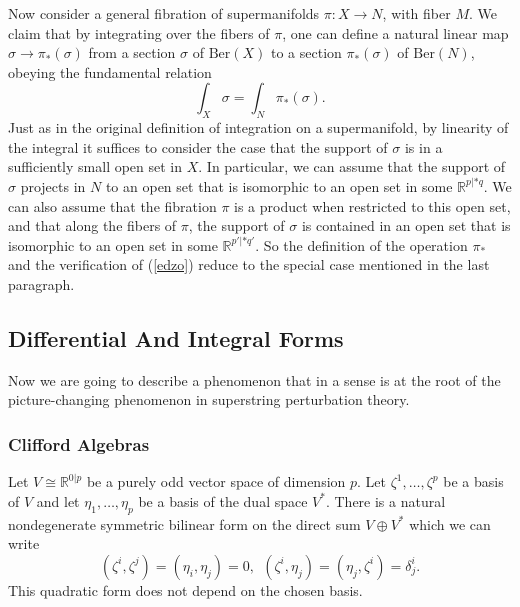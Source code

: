 \documentclass[11pt,a4paper]{article}
\def\R{{\mathbb R}}
\def\Ber{{\mathrm {Ber}}}
\begin{document}
Now consider a general fibration of supermanifolds $\pi:X\to N$, with fiber $M$.  We claim that 
by integrating over the fibers of $\pi$, one can define a natural linear map $\sigma\to \pi_*(\sigma)$
from a section $\sigma$ of $\Ber(X)$ to a section $\pi_*(\sigma)$ of $\Ber(N)$, obeying the fundamental relation
\begin{equation}\label{edzo}\int_X\sigma=\int_N\pi_*(\sigma).\end{equation}
Just as in the original definition of integration on a supermanifold,  by linearity of the integral it suffices to consider the case
that the support of $\sigma$ is in a sufficiently small open set in $X$.  In particular, we can assume that the support of $\sigma$ projects
in $N$ to an open set that is isomorphic to an open set in some $\R^{p|*q}$.  We can also assume that the fibration $\pi$ is
a product when restricted to this open set, and that along the fibers of $\pi$, the support of $\sigma$ is contained in an open
set that is isomorphic to an open set in some $\R^{p'|*q'}$.  So the definition of the operation $\pi_*$ and the verification of (\ref{edzo})
reduce to the special case mentioned in the last paragraph. 

 \subsection{Differential And Integral Forms}\label{informs}

Now we are going to describe a phenomenon that in a sense is at the root of the picture-changing phenomenon in superstring
perturbation theory.

\subsubsection{Clifford Algebras}\label{clifford}

Let  $V\cong \R^{0|p}$ be a purely odd vector space of dimension $p$.  Let $\zeta^1,\dots,\zeta^p$ be a basis of $V$
and let $\eta_1,\dots,\eta_p$ be a basis of the dual space $V^*$.  There is a natural nondegenerate symmetric bilinear form on the direct sum $V\oplus V^*$ which we can  write
\begin{equation}\label{canwrite}(\zeta^i,\zeta^j)=(\eta_i,\eta_j)=0,~~(\zeta^i,\eta_j)=(\eta_j,\zeta^i)=\delta^i_j.\end{equation}
This quadratic form does not depend on the chosen basis.
\end{document}

